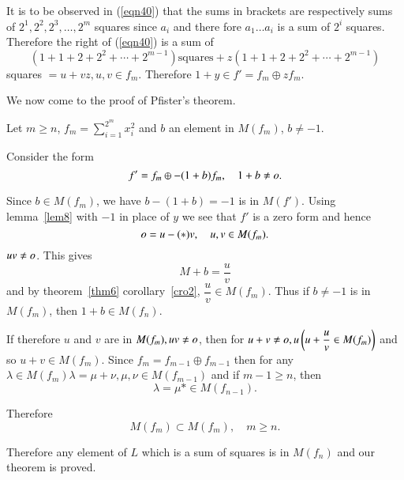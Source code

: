 \begin{Proof}
It is to be observed in (\ref{eqn40}) that the sums in brackets are
respectively sums of $2^{1},2^{2},2^{3},\ldots,2^{m}$ squares since
  $a_i$ and there fore $a_1\ldots a_i$ is a sum of $2^{i}$
  squares. Therefore the right of (\ref{eqn40}) is a sum of 
$$
\left(1+1+2+2^{2}+\cdots+2^{m-1}\right)\text{squares}
+z\left(1+1+2+2^{2}+\cdots+2^{m-1}\right)
$$
squares $=u+vz, u,v\in f_m$. Therefore $1+y\in f'=f_m\oplus zf_{m}$. 

We now come to the proof of Pfister's theorem.

Let $m\geq n$, $f_m=\sum\limits_{i=1}^{2^{m}}x^{2}_i$ and $b$ an
element in $M(f_m)$, $b\neq -1$.

Consider the form
$$
f'=f_m\oplus -(1+b)f_m,\quad 1+b\neq o.
$$

Since $b\in M(f_m)$, we have $b-(1+b)=-1$ is in $M(f')$. Using lemma~\ref{lem8} with $-1$ in place of $y$ we see that $f'$ is a zero form
and hence 
$$
o=u-(*)v, \quad u,v\in M(f_m).
$$
$uv\neq o$. This gives 
$$
M+b=\dfrac{u}{v}
$$
and by theorem~\ref{thm6} corollary~\ref{cro2}, $\dfrac{u}{v}\in
M(f_m)$. Thus if $b\neq-1$ is in $M(f_m)$, then $1+b\in M(f_n)$. 

If therefore $u$ and $v$ are in $M(f_m),uv\neq o$, then for $u+v\neq
\ho, u\break\left(u+\dfrac{u}{v}\in M(f_m)\right)$ and so $u+v\in M(f_m)$. Since
$f_m=f_{m-1}\oplus f_{m-1}$ then for any $\lambda\in
M(f_m)\lambda=\mu+\nu, \mu,\nu \in M(f_{m-1})$ and if $m-1\geq n$, then 
$$
\lambda=\mu* \in M(f_{n-1}).
$$

Therefore
$$
M(f_m)\subset M(f_m),\quad m\geq n.
$$

Therefore any element of $L$ which is a sum of squares is in $M(f_n)$
and our theorem is proved. 
\end{Proof}



